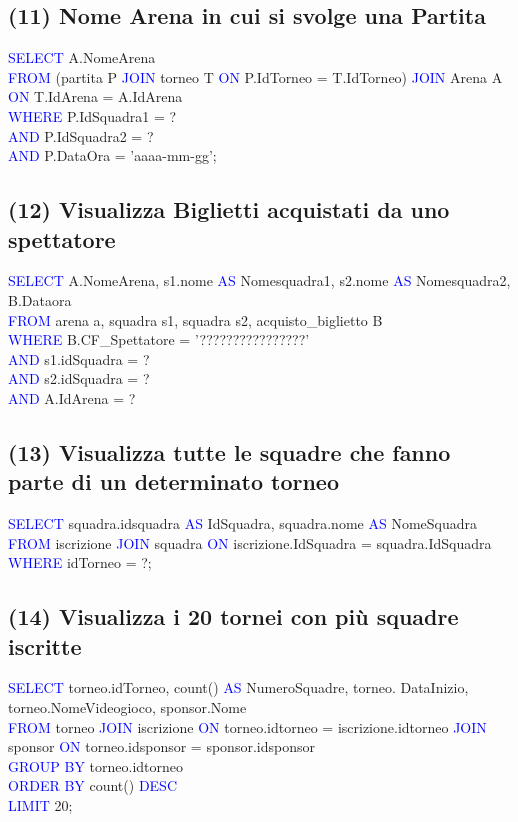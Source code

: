 \documentclass[a4paper,12pt]{report}
\begin{document}
\subsection*{(11) Nome Arena in cui si svolge una Partita}
\textcolor{blue}{SELECT} A.NomeArena \\
\noindent \textcolor{blue}{FROM} (partita P \textcolor{blue}{JOIN} torneo T \textcolor{blue}{ON} P.IdTorneo = T.IdTorneo) \textcolor{blue}{JOIN} Arena A \textcolor{blue}{ON} T.IdArena = A.IdArena \\
\noindent\textcolor{blue}{WHERE} P.IdSquadra1 = ? \\
\noindent\textcolor{blue}{AND} P.IdSquadra2 = ?\\
\noindent\textcolor{blue}{AND} P.DataOra = 'aaaa-mm-gg';
\subsection*{(12)  Visualizza Biglietti acquistati da uno spettatore}
\textcolor{blue}{SELECT} A.NomeArena, s1.nome \textcolor{blue}{AS} Nomesquadra1, s2.nome \textcolor{blue}{AS} Nomesquadra2, B.Dataora \\
\noindent \textcolor{blue}{FROM} arena a, squadra s1, squadra s2, acquisto\_biglietto B\\
\noindent \textcolor{blue}{WHERE} B.CF\_Spettatore = '????????????????' \\
\noindent \textcolor{blue}{AND} s1.idSquadra = ?\\
\noindent \textcolor{blue}{AND} s2.idSquadra = ?\\
\noindent \textcolor{blue}{AND} A.IdArena = ?\\
\subsection*{(13)  Visualizza tutte le squadre che fanno parte di un determinato torneo}
\textcolor{blue}{SELECT} squadra.idsquadra \textcolor{blue}{AS} IdSquadra, squadra.nome \textcolor{blue}{AS} NomeSquadra\\
\noindent \textcolor{blue}{FROM} iscrizione \textcolor{blue}{JOIN} squadra \textcolor{blue}{ON} iscrizione.IdSquadra = squadra.IdSquadra\\
\noindent \textcolor{blue}{WHERE}  idTorneo = ?;\\
\subsection*{(14)  Visualizza i 20 tornei con più squadre iscritte}
\textcolor{blue}{SELECT} torneo.idTorneo, count() \textcolor{blue}{AS} NumeroSquadre,  torneo. DataInizio, torneo.NomeVideogioco, sponsor.Nome \\
\noindent \textcolor{blue}{FROM} torneo \textcolor{blue}{JOIN} iscrizione \textcolor{blue}{ON} torneo.idtorneo = iscrizione.idtorneo  \textcolor{blue}{JOIN} sponsor \textcolor{blue}{ON} torneo.idsponsor = sponsor.idsponsor \\
\noindent \textcolor{blue}{GROUP BY} torneo.idtorneo \\
\noindent \textcolor{blue}{ORDER BY} count() \textcolor{blue}{DESC} \\
\noindent \textcolor{blue}{LIMIT} 20;\\
\end{document}
